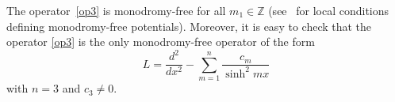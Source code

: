 \documentclass[12pt]{amsart}
\newcommand{\Z}{\mathbb Z}
\numberwithin{equation}{section}
\theoremstyle{definition}
\begin{document}
The operator~\eqref{op3} is monodromy-free for all $m_1 \in \Z$ (see~\cite{DG} for local conditions defining monodromy-free potentials). 
Moreover, it is easy to check that the operator \eqref{op3} is the only monodromy-free operator of the form 
\begin{equation*}
    L = \frac{d^2}{dx^2} - \sum\limits_{m = 1}^n 
    \frac{c_m}{\sinh^2 m x}
\end{equation*}
with $n=3$ and $c_3 \neq 0$. 
\end{document}
